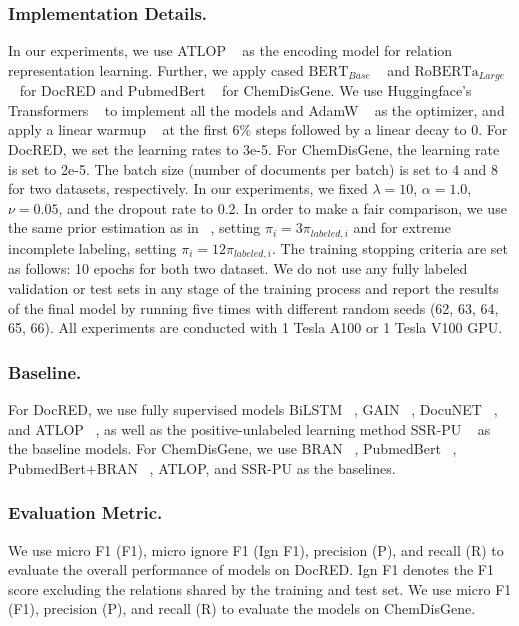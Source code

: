\documentclass[letterpaper]{article} %
\begin{document}
\subsubsection{Implementation Details.}
In our experiments, we use ATLOP ~\cite{DBLP:conf/aaai/Zhou0M021} as the encoding model for relation representation learning. Further, we apply cased $\mathrm{BERT}_{Base}$ ~\cite{DBLP:conf/naacl/DevlinCLT19} and $\mathrm{RoBERTa}_{Large}$ ~\cite{DBLP:journals/corr/abs-1907-11692} for DocRED and $\mathrm{PubmedBert}$ ~\cite{DBLP:journals/health/GuTCLULNGP22} for ChemDisGene. We use Huggingface's Transformers ~\cite{DBLP:conf/emnlp/WolfDSCDMCRLFDS20} to implement all the models and AdamW ~\cite{DBLP:conf/iclr/LoshchilovH19} as the optimizer, and apply a linear warmup ~\cite{DBLP:journals/corr/GoyalDGNWKTJH17} at the first 6\% steps followed by a linear decay to 0. For DocRED, we set the learning rates to 3e-5. For ChemDisGene, the learning rate is set to 2e-5. The batch size (number of documents per batch) is set to 4 and 8 for two datasets, respectively. In our experiments, we fixed $\lambda=10$, $\alpha=1.0$, $\nu=0.05$, and the dropout rate to 0.2. In order to make a fair comparison, we use the same prior estimation as in ~\cite{DBLP:conf/emnlp/WangLHZ22}, setting $\pi_{i}=3\pi_{labeled,i}$ and for extreme incomplete labeling, setting $\pi_{i}=12\pi_{labeled,i}$. The training stopping criteria are set as follows: 10 epochs for both two dataset. We do not use any fully labeled validation or test sets in any stage of the training process and report the results of the final model by running five times with different random seeds (62, 63, 64, 65, 66). All experiments are conducted with 1 Tesla A100 or 1 Tesla V100 GPU.

\subsubsection{Baseline.}
For DocRED, we use fully supervised models BiLSTM ~\cite{DBLP:conf/acl/YaoYLHLLLHZS19}, GAIN ~\cite{DBLP:conf/emnlp/ZengXCL20}, DocuNET ~\cite{DBLP:conf/ijcai/ZhangCXDTCHSC21}, and ATLOP ~\cite{DBLP:conf/aaai/Zhou0M021}, as well as the positive-unlabeled learning method SSR-PU ~\cite{DBLP:conf/emnlp/WangLHZ22} as the baseline models. For ChemDisGene, we use BRAN ~\cite{DBLP:conf/naacl/VergaSM18}, PubmedBert ~\cite{DBLP:journals/health/GuTCLULNGP22}, PubmedBert+BRAN ~\cite{DBLP:conf/lrec/ZhangMTM22}, ATLOP, and SSR-PU as the baselines.

\subsubsection{Evaluation Metric.}
We use micro F1 (F1), micro ignore F1 (Ign F1), precision (P), and recall (R) to evaluate the overall performance of models on DocRED. Ign F1 denotes the F1 score excluding the relations shared by the training and test set. We use micro F1 (F1), precision (P), and recall (R) to evaluate the models on ChemDisGene.
\end{document}
